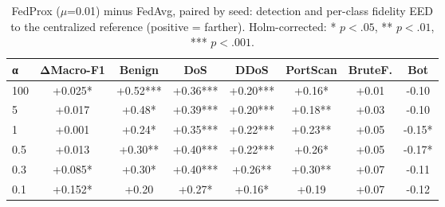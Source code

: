 \begin{table}[t]
\centering
\caption{FedProx ($\mu$=0.01) minus FedAvg, paired by seed: detection and per-class fidelity EED to the centralized reference (positive = farther). Holm-corrected: * $p<.05$, ** $p<.01$, *** $p<.001$.}
\label{tab:fedprox}
\scriptsize
\setlength{\tabcolsep}{3pt}
\begin{tabular}{lccccccc}
\toprule
α & ΔMacro-F1 & Benign & DoS & DDoS & PortScan & BruteF. & Bot \\
\midrule
100 & +0.025* & +0.52*** & +0.36*** & +0.20*** & +0.16* & +0.01 & -0.10 \\
5 & +0.017 & +0.48* & +0.39*** & +0.20*** & +0.18** & +0.03 & -0.10 \\
1 & +0.001 & +0.24* & +0.35*** & +0.22*** & +0.23** & +0.05 & -0.15* \\
0.5 & +0.013 & +0.30** & +0.40*** & +0.22*** & +0.26* & +0.05 & -0.17* \\
0.3 & +0.085* & +0.30* & +0.40*** & +0.26** & +0.30** & +0.07 & -0.11 \\
0.1 & +0.152* & +0.20 & +0.27* & +0.16* & +0.19 & +0.07 & -0.12 \\
\bottomrule
\end{tabular}
\end{table}